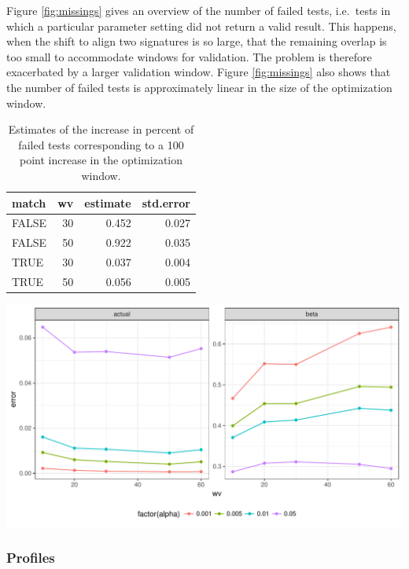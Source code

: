 \documentclass[12pt]{article}
\begin{document}
Figure \ref{fig:missings} gives an overview of the number of failed
tests, i.e.~tests in which a particular parameter setting did not return
a valid result. This happens, when the shift to align two signatures is
so large, that the remaining overlap is too small to accommodate windows
for validation. The problem is therefore exacerbated by a larger
validation window. Figure \ref{fig:missings} also shows that the number
of failed tests is approximately linear in the size of the optimization
window.

\begin{table}

\caption{\label{tab:lms}Estimates of the increase in percent of failed tests corresponding to a 100 point increase in the optimization window.}
\centering
\begin{tabular}[t]{lrrr}
\toprule
match & wv & estimate & std.error\\
\midrule
FALSE & 30 & 0.452 & 0.027\\
FALSE & 50 & 0.922 & 0.035\\
TRUE & 30 & 0.037 & 0.004\\
TRUE & 50 & 0.056 & 0.005\\
\bottomrule
\end{tabular}
\end{table}

\begin{center}\includegraphics[width=\textwidth]{figures/wo120-1} \end{center}

\subsubsection{Profiles}\label{profiles}
\end{document}
